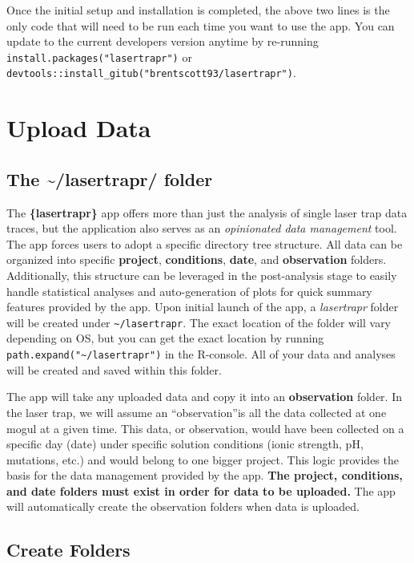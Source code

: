 \documentclass[
]{book}
\begin{document}
Once the initial setup and installation is completed, the above two lines is the only code that will need to be run each time you want to use the app. You can update to the current developers version anytime by re-running \texttt{install.packages("lasertrapr")} or \texttt{devtools::install\_gitub("brentscott93/lasertrapr")}.

\chapter{Upload Data}\label{upload}

\section{The \textasciitilde/lasertrapr/ folder}\label{the-lasertrapr-folder}

The \textbf{\{lasertrapr\}} app offers more than just the analysis of single laser trap data traces, but the application also serves as an \emph{opinionated data management} tool. The app forces users to adopt a specific directory tree structure. All data can be organized into specific \textbf{project}, \textbf{conditions}, \textbf{date}, and \textbf{observation} folders. Additionally, this structure can be leveraged in the post-analysis stage to easily handle statistical analyses and auto-generation of plots for quick summary features provided by the app. Upon initial launch of the app, a \emph{lasertrapr} folder will be created under \texttt{\textasciitilde{}/lasertrapr}. The exact location of the folder will vary depending on OS, but you can get the exact location by running \texttt{path.expand("\textasciitilde{}/lasertrapr")} in the R-console. All of your data and analyses will be created and saved within this folder.

The app will take any uploaded data and copy it into an \textbf{observation} folder. In the laser trap, we will assume an ``observation''is all the data collected at one mogul at a given time. This data, or observation, would have been collected on a specific day (date) under specific solution conditions (ionic strength, pH, mutations, etc.) and would belong to one bigger project. This logic provides the basis for the data management provided by the app. \textbf{The project, conditions, and date folders must exist in order for data to be uploaded.} The app will automatically create the observation folders when data is uploaded.

\section{Create Folders}\label{create-folders}
\end{document}
